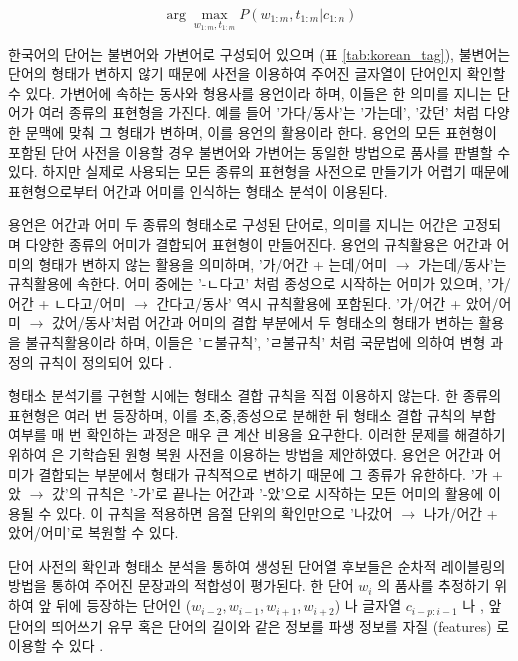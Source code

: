 \documentclass[oneside, ko,phd]{snuthesis_utf8_kor}
\begin{document}
\begin{equation}
\label{eq:korean_pos_obj}
\arg \max_{w_{1:m},t_{1:m}} P(w_{1:m}, t_{1:m} \vert c_{1:n})
\end{equation}

한국어의 단어는 불변어와 가변어로 구성되어 있으며 (표 \ref{tab:korean_tag}), 불변어는 단어의 형태가 변하지 않기 때문에 사전을 이용하여 주어진 글자열이 단어인지 확인할 수 있다.
가변어에 속하는 동사와 형용사를 용언이라 하며, 이들은 한 의미를 지니는 단어가 여러 종류의 표현형을 가진다.
예를 들어 '가다/동사'는 '가는데', '갔던' 처럼 다양한 문맥에 맞춰 그 형태가 변하며, 이를 용언의 활용이라 한다.
용언의 모든 표현형이 포함된 단어 사전을 이용할 경우 불변어와 가변어는 동일한 방법으로 품사를 판별할 수 있다.
하지만 실제로 사용되는 모든 종류의 표현형을 사전으로 만들기가 어렵기 때문에 표현형으로부터 어간과 어미를 인식하는 형태소 분석이 이용된다.

용언은 어간과 어미 두 종류의 형태소로 구성된 단어로, 의미를 지니는 어간은 고정되며 다양한 종류의 어미가 결합되어 표현형이 만들어진다.
용언의 규칙활용은 어간과 어미의 형태가 변하지 않는 활용을 의미하며, '가/어간 + 는데/어미 $\rightarrow$ 가는데/동사'는 규칙활용에 속한다.
어미 중에는 '-ㄴ다고' 처럼 종성으로 시작하는 어미가 있으며, '가/어간 + ㄴ다고/어미 $\rightarrow$ 간다고/동사' 역시 규칙활용에 포함된다.
'가/어간 + 았어/어미 $\rightarrow$ 갔어/동사'처럼 어간과 어미의 결합 부분에서 두 형태소의 형태가 변하는 활용을 불규칙활용이라 하며, 이들은 'ㄷ불규칙', 'ㄹ불규칙' 처럼 국문법에 의하여 변형 과정의 규칙이 정의되어 있다 \cite{kang1995syllable}.

형태소 분석기를 구현할 시에는 형태소 결합 규칙을 직접 이용하지 않는다.
한 종류의 표현형은 여러 번 등장하며, 이를 초,중,종성으로 분해한 뒤 형태소 결합 규칙의 부합 여부를 매 번 확인하는 과정은 매우 큰 계산 비용을 요구한다.
이러한 문제를 해결하기 위하여 \cite{shim2013syllable} 은 기학습된 원형 복원 사전을 이용하는 방법을 제안하였다.
용언은 어간과 어미가 결합되는 부분에서 형태가 규칙적으로 변하기 때문에 그 종류가 유한하다.
'가 + 았 $\rightarrow$ 갔'의 규칙은 '-가'로 끝나는 어간과 '-았'으로 시작하는 모든 어미의 활용에 이용될 수 있다.
이 규칙을 적용하면 음절 단위의 확인만으로 '나갔어 $\rightarrow$ 나가/어간 + 았어/어미'로 복원할 수 있다.

단어 사전의 확인과 형태소 분석을 통하여 생성된 단어열 후보들은 순차적 레이블링의 방법을 통하여 주어진 문장과의 적합성이 평가된다.
한 단어 $w_i$ 의 품사를 추정하기 위하여 앞 뒤에 등장하는 단어인 ($w_{i-2}, w_{i-1}, w_{i+1}, w_{i+2}$) 나 글자열 $c_{i-p:i-1}$  나 \cite{lee2013joint}, 앞 단어의 띄어쓰기 유무 혹은 단어의 길이와 같은 정보를 파생 정보를 자질 (features) 로 이용할 수 있다 \cite{na2012crfs}.
\end{document}
